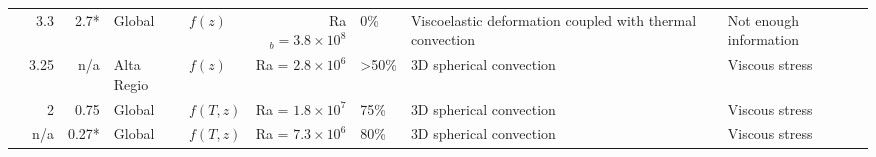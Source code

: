 \begin{landscape}
\begin{longtable}{ @{} p{4cm} r r p{2cm} p{2cm} r p{1.5cm} p{3.2cm} p{3.1cm} @{} }



\citet{Golle2012} & 3.3 & 2.7*  & Global & $f(z)$ & Ra$_b = 3.8\times 10^8$ & 0\% & Viscoelastic deformation coupled with thermal convection &  Not enough information \\



\citet{Benesova2012} &  3.25 & n/a   & Alta Regio  & $f(z)$ & Ra = $2.8 \times 10^6$ & \textgreater 50\% & 3D spherical convection & Viscous stress \\



\citet{Huang2013} & 2\textendash 3 & 0.75 & Global & $f(T,z)$ & Ra = $1.8\times 10^7$ & 75\% & 3D spherical convection & Viscous stress \\

\citet{Yang2016} & n/a & 0.27* & Global & $f(T,z)$ &  Ra = $7.3\times 10^6$ & 80\% & 3D spherical convection & Viscous stress \\


\bottomrule


\end{longtable}
\end{landscape}


